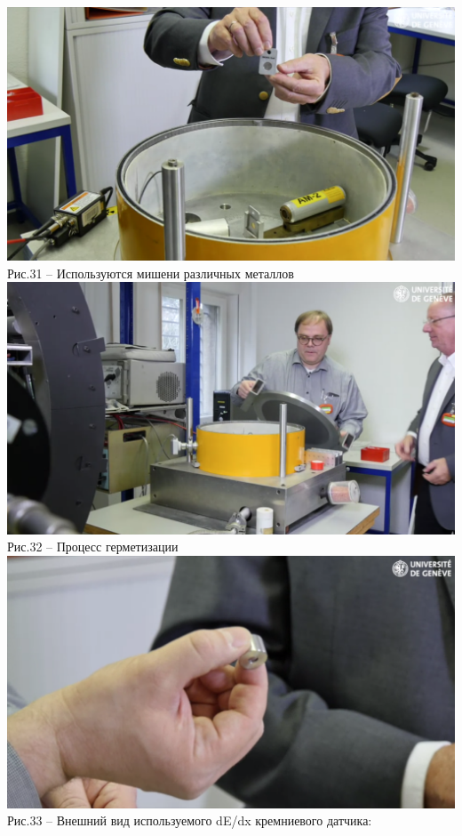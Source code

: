 \documentclass[11pt]{report}
\begin{document}
\includegraphics[scale=0.22]{ust_a_8}\\
Рис.31 -- Используются мишени различных металлов \\

\includegraphics[scale=0.22]{ust_a_6}\\
Рис.32 -- Процесс герметизации\\

\includegraphics[scale=0.22]{ust_a_9}\\
Рис.33 -- Внешний вид используемого dE/dx кремниевого датчика:\\
\end{document}
